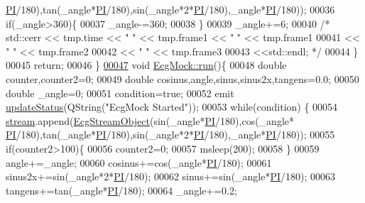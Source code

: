 \begin{DoxyCode}
      \hyperlink{ecgmock_8h_a598a3330b3c21701223ee0ca14316eca}{PI}/180),tan(\_angle*\hyperlink{ecgmock_8h_a598a3330b3c21701223ee0ca14316eca}{PI}/180),sin(\_angle*2*\hyperlink{ecgmock_8h_a598a3330b3c21701223ee0ca14316eca}{PI}/180),\_angle*\hyperlink{ecgmock_8h_a598a3330b3c21701223ee0ca14316eca}{PI}/180));
00036         \textcolor{keywordflow}{if}(\_angle>360)\{
00037             \_angle-=360;
00038         \}
00039         \_angle+=6;
00040         \textcolor{comment}{/*      std::cerr << tmp.time << "  " << tmp.frame1 << "  " << tmp.frame1}
00041 \textcolor{comment}{                << "  " << tmp.frame2}
00042 \textcolor{comment}{                << "  " << tmp.frame3}
00043 \textcolor{comment}{                <<std::endl; */}
00044     \}
00045     \textcolor{keywordflow}{return};
00046 \}
\hypertarget{ecgmock_8cpp_source.tex_l00047}{}\hyperlink{classEcgMock_a8822f99759fcfe9648262007cb380daa}{00047} \textcolor{keywordtype}{void} \hyperlink{classEcgMock_a8822f99759fcfe9648262007cb380daa}{EcgMock::run}()\{
00048     \textcolor{keywordtype}{double} counter,counter2=0;
00049     \textcolor{keywordtype}{double} cosinus,angle,sinus,sinus2x,tangens=0.0;
00050     \textcolor{keywordtype}{double} \_angle=0;
00051     condition=\textcolor{keyword}{true};
00052     emit \hyperlink{classDeviceInterface_ac64a65f54f41f0b7ff4c846ac7fdbef7}{updateStatus}(QString(\textcolor{stringliteral}{"EcgMock Started"}));
00053     \textcolor{keywordflow}{while}(condition) \{
00054         \hyperlink{classDeviceInterface_ac98f5cd34bafb43265436b29b9f734fa}{stream}.append(\hyperlink{structEcgStreamObject}{EcgStreamObject}(sin(\_angle*\hyperlink{ecgmock_8h_a598a3330b3c21701223ee0ca14316eca}{PI}/180),cos(\_angle*
      \hyperlink{ecgmock_8h_a598a3330b3c21701223ee0ca14316eca}{PI}/180),tan(\_angle*\hyperlink{ecgmock_8h_a598a3330b3c21701223ee0ca14316eca}{PI}/180),sin(\_angle*2*\hyperlink{ecgmock_8h_a598a3330b3c21701223ee0ca14316eca}{PI}/180),\_angle*\hyperlink{ecgmock_8h_a598a3330b3c21701223ee0ca14316eca}{PI}/180));
00055         \textcolor{keywordflow}{if}(counter2>100)\{
00056             counter2=0;
00057             msleep(200);
00058         \}
00059         angle+=\_angle;
00060         cosinus+=cos(\_angle*\hyperlink{ecgmock_8h_a598a3330b3c21701223ee0ca14316eca}{PI}/180);
00061         sinus2x+=sin(\_angle*2*\hyperlink{ecgmock_8h_a598a3330b3c21701223ee0ca14316eca}{PI}/180);
00062         sinus+=sin(\_angle*\hyperlink{ecgmock_8h_a598a3330b3c21701223ee0ca14316eca}{PI}/180);
00063         tangens+=tan(\_angle*\hyperlink{ecgmock_8h_a598a3330b3c21701223ee0ca14316eca}{PI}/180);
00064         \_angle+=0.2;

\end{DoxyCode}

